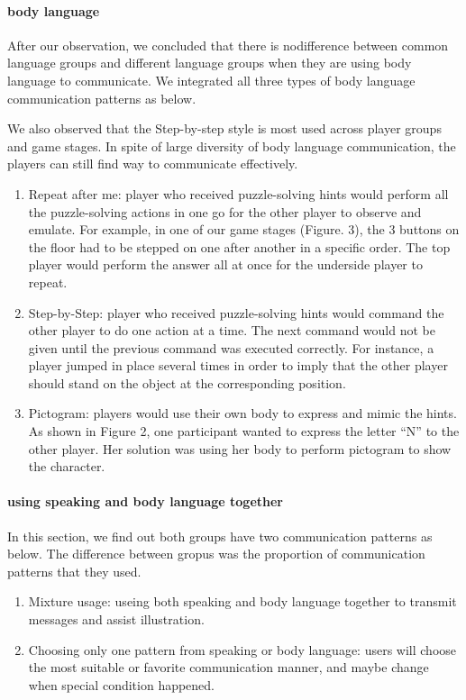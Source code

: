 \paragraph{body language}
After our observation, we concluded that there is nodifference between common language groups and different language groups when they are using body language to communicate. We integrated all three types of body language communication patterns as below. 

We also observed that the Step-by-step style is most used across player groups and game stages. In spite of large diversity of body language communication, the players can still find way to communicate effectively.

\begin{enumerate}
  \item Repeat after me: player who received puzzle-solving hints would perform all the puzzle-solving actions in one go for the other player to observe and emulate. For example, in one of our game stages (Figure. 3), the 3 buttons on the floor had to be stepped on one after another in a specific order. The top player would perform the answer all at once for the underside player to repeat. 
 
  \item Step-by-Step: player who received puzzle-solving hints would command the other player to do one action at a time. The next command would not be given until the previous command was executed correctly. For instance, a player jumped in place several times in order to imply that the other player should stand on the object at the corresponding position.
                                  
  \item Pictogram: players would use their own body to express and mimic the hints. As shown in Figure 2, one participant wanted to express the letter “N” to the other player. Her solution was using her body to perform pictogram to show the character.
\end{enumerate}

\paragraph{using speaking and body language together}
In this section, we find out both groups have two communication patterns as below. The difference between gropus was the proportion of communication patterns that they used.

\begin{enumerate}
  \item Mixture usage: useing both speaking and body language together to transmit messages and assist illustration.

  \item Choosing only one pattern from speaking or body language: users will choose the most suitable or favorite communication manner, and maybe change when special condition happened.
\end{enumerate}


